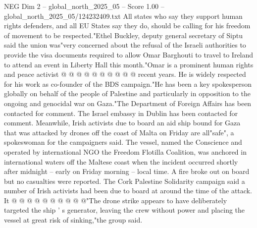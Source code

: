 \begin{textsample}{NEG Dim 2 – global\_north\_2025\_05 – Score 1.00 – global\_north\_2025\_05/124232409.txt}
All states who say they support human rights defenders, and all EU States say they do, should be calling for his freedom of movement to be respected."Ethel Buckley, deputy general secretary of Siptu said the union was"very concerned about the refusal of the Israeli authorities to provide the visa documents required to allow Omar Barghouti to travel to Ireland to attend an event in Liberty Hall this month."Omar is a prominent human rights and peace activist @ @ @ @ @ @ @ @ @ @ recent years.
He is widely respected for his work as co-founder of the BDS campaign."He has been a key spokesperson globally on behalf of the people of Palestine and particularly in opposition to the ongoing and genocidal war on Gaza."The Department of Foreign Affairs has been contacted for comment.
The Israel embassy in Dublin has been contacted for comment.
Meanwhile, Irish activists due to board an aid ship bound for Gaza that was attacked by drones off the coast of Malta on Friday are all"safe", a spokeswoman for the campaigners said.
The vessel, named the Conscience and operated by international NGO the Freedom Flotilla Coalition, was anchored in international waters off the Maltese coast when the incident occurred shortly after midnight -- early on Friday morning -- local time.
A fire broke out on board but no casualties were reported.
The Cork Palestine Solidarity campaign said a number of Irish activists had been due to board at around the time of the attack.
It @ @ @ @ @ @ @ @ @ @"The drone strike appears to have deliberately targeted the ship ' s generator, leaving the crew without power and placing the vessel at great risk of sinking,"the group said.

\end{textsample}
